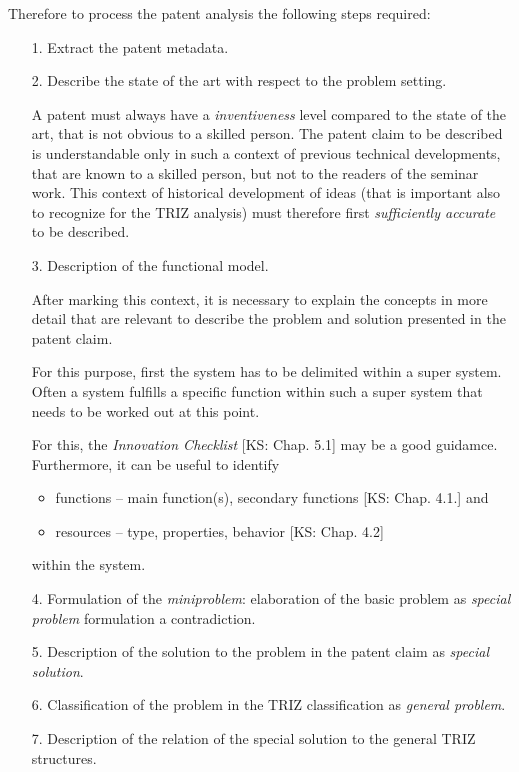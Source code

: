 \documentclass[11pt,a4paper]{article}
\begin{document}
Therefore to process the patent analysis the following steps required:
\begin{itemize}
\item [1.] Extract the patent metadata.
  
\item [2.] Describe the state of the art with respect to the problem setting.

  A patent must always have a \emph{inventiveness} level compared to the state
  of the art, that is not obvious to a skilled person. The patent claim to be
  described is understandable only in such a context of previous technical
  developments, that are known to a skilled person, but not to the readers of
  the seminar work. This context of historical development of ideas (that is
  important also to recognize for the TRIZ analysis) must therefore first
  \emph{sufficiently accurate} to be described.

\item [3.] Description of the functional model.

  After marking this context, it is necessary to explain the concepts in more
  detail that are relevant to describe the problem and solution presented in
  the patent claim.

  For this purpose, first the system has to be delimited within a super
  system.  Often a system fulfills a specific function within such a super
  system that needs to be worked out at this point.
  
  For this, the \emph{Innovation Checklist} [KS: Chap. 5.1] may be a good
  guidamce. Furthermore, it can be useful to identify
  \begin{itemize}
  \item functions -- main function(s), secondary functions [KS: Chap. 4.1.]
    and
  \item resources -- type, properties, behavior [KS: Chap. 4.2]
  \end{itemize}
  within the system.

\item [4.] Formulation of the \emph{miniproblem}: elaboration of the basic
  problem as \emph{special problem} formulation a contradiction.

\item [5.] Description of the solution to the problem in the patent claim as
  \emph{special solution}.

\item [6.] Classification of the problem in the TRIZ classification as
  \emph{general problem}.

\item [7.] Description of the relation of the special solution to the general
  TRIZ structures.
\end{itemize}
\end{document}

